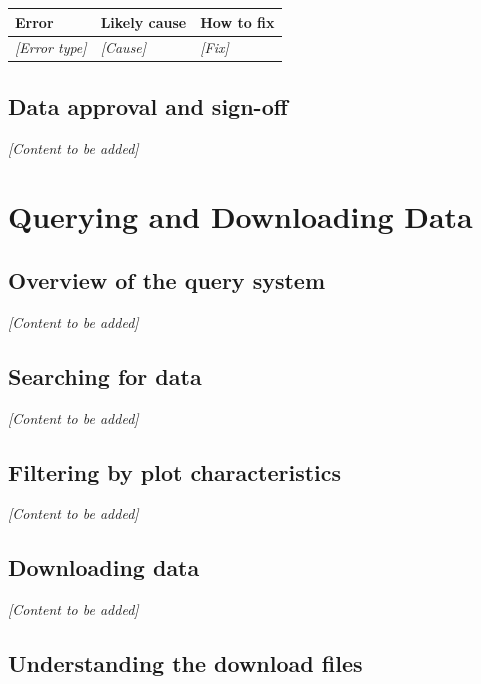 \documentclass[
]{book}
\newcounter{none} %
\begin{document}
{\def\LTcaptype{none} %
\begin{longtable}[]{@{}lll@{}}
\toprule\noalign{}
Error & Likely cause & How to fix \\
\midrule\noalign{}
\endhead
\bottomrule\noalign{}
\endlastfoot
\emph{{[}Error type{]}} & \emph{{[}Cause{]}} & \emph{{[}Fix{]}} \\
\end{longtable}
}

\section{Data approval and sign-off}\label{data-approval-and-sign-off}

\emph{{[}Content to be added{]}}

\chapter{Querying and Downloading Data}\label{querying-data}

\section{Overview of the query system}\label{overview-of-the-query-system}

\emph{{[}Content to be added{]}}

\section{Searching for data}\label{searching-for-data}

\emph{{[}Content to be added{]}}

\section{Filtering by plot characteristics}\label{filtering-by-plot-characteristics}

\emph{{[}Content to be added{]}}

\section{Downloading data}\label{downloading-data}

\emph{{[}Content to be added{]}}

\section{Understanding the download files}\label{understanding-the-download-files}
\end{document}
